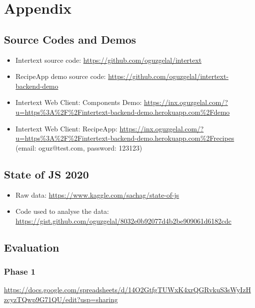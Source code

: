 \chapter{Appendix} \label{App:AppendixA}

\section{Source Codes and Demos}

\begin{itemize}
    \item Intertext source code: \url{https://github.com/oguzgelal/intertext}
    
    \item RecipeApp demo source code: \url{https://github.com/oguzgelal/intertext-backend-demo}
    
    \item Intertext Web Client: Components Demo: \url{https://inx.oguzgelal.com/?u=https\%3A\%2F\%2Fintertext-backend-demo.herokuapp.com\%2Fdemo}
    
    \item Intertext Web Client: RecipeApp: \url{https://inx.oguzgelal.com/?u=https\%3A\%2F\%2Fintertext-backend-demo.herokuapp.com\%2Frecipes} (email: oguz@test.com, password: 123123)
\end{itemize}

\section{State of JS 2020}

\begin{itemize}
    \item Raw data: \url{https://www.kaggle.com/sachag/state-of-js}
    \item Code used to analyse the data: \url{https://gist.github.com/oguzgelal/8032e0b92077d4b2be909061d6182cdc}
\end{itemize}


\section{Evaluation}

\subsection{Phase 1}

\url{https://docs.google.com/spreadsheets/d/14O2GtfgTUWxK4xrQGRvkuS3sWyIzHzcyzTQwp9G71QU/edit?usp=sharing}

